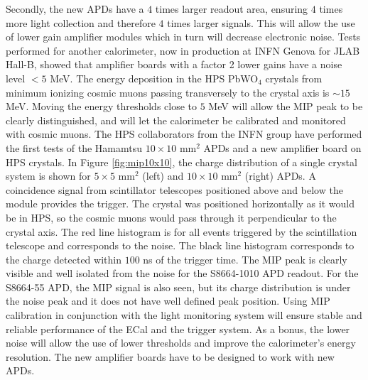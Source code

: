 \begin{enumerate}
Secondly, the new APDs have a $4$ times larger readout area, ensuring $4$ times more light collection and therefore $4$ times larger signals. This will allow the use of lower gain amplifier modules which in turn will decrease electronic noise. Tests 
performed for another calorimeter, now in production at INFN Genova for JLAB Hall-B, showed that amplifier boards 
with a factor 2 lower gains have a noise level $<5$ MeV. The energy deposition in the HPS PbWO$_4$ crystals  
from minimum ionizing cosmic muons passing transversely to the crystal axis is $\sim 15$ MeV. Moving the energy thresholds 
close to $5$ MeV will allow the MIP peak to be clearly distinguished, and will let the calorimeter  be calibrated and monitored with cosmic muons. The HPS collaborators 
from the INFN group have performed the first tests of the Hamamtsu $10\times 10$ mm$^2$ APDs and a new amplifier board on HPS crystals. In 
Figure \ref{fig:mip10x10}, the charge distribution of a single crystal system is shown for $5\times 5$ mm$^2$ (left) and $10\times 
10$ mm$^2$ (right) APDs. A coincidence signal from scintillator telescopes positioned above and below the module provides the trigger. 
The crystal was positioned horizontally as it would be in HPS, so the cosmic muons would pass through it perpendicular to the crystal axis. The red line 
histogram is for all events triggered by the scintillation telescope and corresponds to the noise. The black line histogram corresponds 
to the charge detected within $100$ ns of the trigger time. The MIP peak is clearly visible and well isolated from the noise 
for the S8664-1010 APD readout. For  the S8664-55 APD, the MIP signal is also seen, but its charge distribution is under the noise peak and it
does not have well defined peak position. Using MIP calibration in conjunction with the light monitoring system will ensure stable and reliable performance of the ECal and the trigger system. As a bonus, the lower noise will allow the use of lower  thresholds and improve the calorimeter's energy resolution. The new amplifier boards have to be designed to work with new APDs. 


\end{enumerate}
